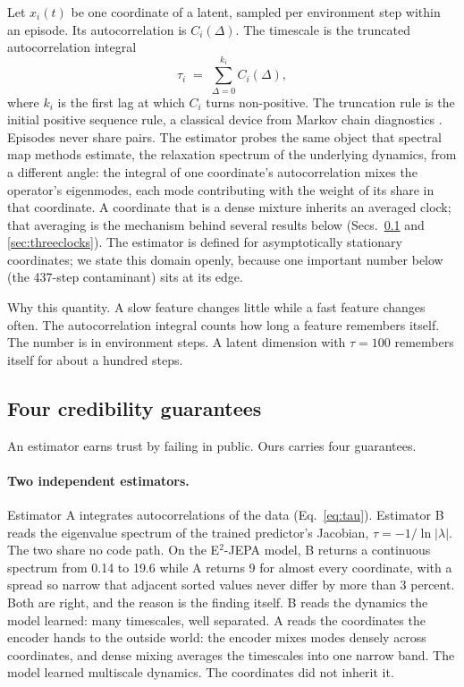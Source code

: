 \documentclass[11pt]{article}
\newcommand{\tauc}{\tau}
\begin{document}
Let $x_i(t)$ be one coordinate of a latent, sampled per environment step within an episode.
Its autocorrelation is $C_i(\Delta)$.
The timescale is the truncated autocorrelation integral
\begin{equation}
\tauc_i \;=\; \sum_{\Delta=0}^{k_i} C_i(\Delta),
\label{eq:tau}
\end{equation}
where $k_i$ is the first lag at which $C_i$ turns non-positive.
The truncation rule is the initial positive sequence rule, a classical device from Markov chain diagnostics \citep{geyer92}.
Episodes never share pairs.
The estimator probes the same object that spectral map methods estimate, the relaxation spectrum of the underlying dynamics, from a different angle: the integral of one coordinate's autocorrelation mixes the operator's eigenmodes, each mode contributing with the weight of its share in that coordinate.
A coordinate that is a dense mixture inherits an averaged clock; that averaging is the mechanism behind several results below (Secs.~\ref{sec:credibility} and \ref{sec:threeclocks}).
The estimator is defined for asymptotically stationary coordinates; we state this domain openly, because one important number below (the 437-step contaminant) sits at its edge.

Why this quantity.
A slow feature changes little while a fast feature changes often.
The autocorrelation integral counts how long a feature remembers itself.
The number is in environment steps.
A latent dimension with $\tauc = 100$ remembers itself for about a hundred steps.

\subsection{Four credibility guarantees}
\label{sec:credibility}

An estimator earns trust by failing in public.
Ours carries four guarantees.

\paragraph{Two independent estimators.}
Estimator A integrates autocorrelations of the data (Eq.~\ref{eq:tau}).
Estimator B reads the eigenvalue spectrum of the trained predictor's Jacobian, $\tauc = -1/\ln|\lambda|$.
The two share no code path.
On the E$^2$-JEPA model, B returns a continuous spectrum from 0.14 to 19.6 while A returns 9 for almost every coordinate, with a spread so narrow that adjacent sorted values never differ by more than 3 percent.
Both are right, and the reason is the finding itself.
B reads the dynamics the model learned: many timescales, well separated.
A reads the coordinates the encoder hands to the outside world: the encoder mixes modes densely across coordinates, and dense mixing averages the timescales into one narrow band.
The model learned multiscale dynamics.
The coordinates did not inherit it.
\end{document}
